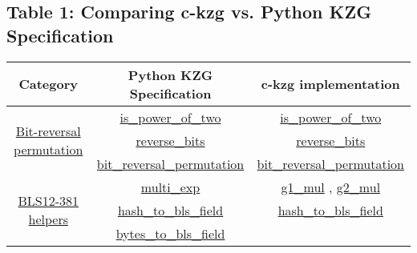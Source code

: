 \documentclass[12pt]{galois-whitepaper}
\begin{document}
\subsection{Table 1: Comparing c-kzg vs. Python KZG Specification}
\begin{center}
    \begin{tabular}{ |c|c|c| }
        \hline
        \textbf{Category} & \textbf{Python KZG Specification} & \textbf{c-kzg implementation} \\ 
        \hline
        \multirow{3}{10em}{\href{https://github.com/ethereum/consensus-specs/blob/dev/specs/deneb/polynomial-commitments.md\#bit-reversal-permutation}{Bit-reversal permutation}}
            & \href{https://github.com/ethereum/consensus-specs/blob/dev/specs/deneb/polynomial-commitments.md\#is_power_of_two}{is\_power\_of\_two}
            & \href{https://github.com/ethereum/c-kzg-4844/blob/main/src/common/utils.c\#L35}{is\_power\_of\_two} \\
            & \href{https://github.com/ethereum/consensus-specs/blob/dev/specs/deneb/polynomial-commitments.md\#reverse_bits}{reverse\_bits} 
            & \href{https://github.com/ethereum/c-kzg-4844/blob/main/src/common/utils.c\#L64}{reverse\_bits} \\
            & \href{https://github.com/ethereum/consensus-specs/blob/dev/specs/deneb/polynomial-commitments.md\#bit_reversal_permutation}{bit\_reversal\_permutation}
            & \href{https://github.com/ethereum/c-kzg-4844/blob/main/src/common/utils.c\#L102}{bit\_reversal\_permutation} \\
        \hline
        \multirow{14}{10em}{\href{https://github.com/ethereum/consensus-specs/blob/dev/specs/deneb/polynomial-commitments.md\#bls12-381-helpers}{BLS12-381 helpers}}
            & \href{https://github.com/ethereum/consensus-specs/blob/dev/specs/deneb/polynomial-commitments.md\#multi_exp}{multi\_exp}
            & \href{https://github.com/ethereum/c-kzg-4844/blob/main/src/common/ec.c\#L42}{g1\_mul}
            , \href{https://github.com/ethereum/c-kzg-4844/blob/main/src/eip4844/eip4844.c\#L124}{g2\_mul}\\
            & \href{https://github.com/ethereum/consensus-specs/blob/dev/specs/deneb/polynomial-commitments.md\#hash_to_bls_field}{hash\_to\_bls\_field}
            & \href{https://github.com/ethereum/c-kzg-4844/blob/main/src/common/bytes.c\#L123}{hash\_to\_bls\_field}\\
            & \href{https://github.com/ethereum/consensus-specs/blob/dev/specs/deneb/polynomial-commitments.md\#bytes_to_bls_field}{bytes\_to\_bls\_field}

\end{tabular}
\end{center}
\end{document}

